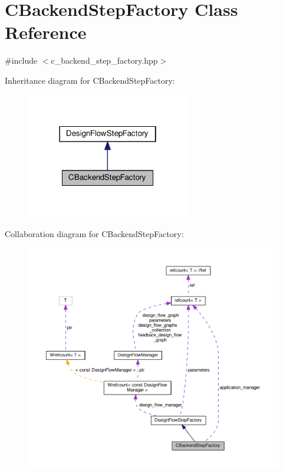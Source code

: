 \hypertarget{classCBackendStepFactory}{}\section{C\+Backend\+Step\+Factory Class Reference}
\label{classCBackendStepFactory}


{\ttfamily \#include $<$c\+\_\+backend\+\_\+step\+\_\+factory.\+hpp$>$}



Inheritance diagram for C\+Backend\+Step\+Factory\+:
\nopagebreak
\begin{figure}[H]
\begin{center}
\leavevmode
\includegraphics[width=202pt]{de/d65/classCBackendStepFactory__inherit__graph}
\end{center}
\end{figure}


Collaboration diagram for C\+Backend\+Step\+Factory\+:
\nopagebreak
\begin{figure}[H]
\begin{center}
\leavevmode
\includegraphics[width=350pt]{d9/d1e/classCBackendStepFactory__coll__graph}
\end{center}
\end{figure}
